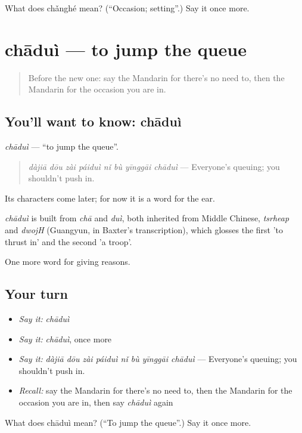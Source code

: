 \begin{tcolorbox}[breakable,colback=teal!4,colframe=teal!35!black,title={Before you move on}]
What does chǎnghé mean? (\textquotedblleft{}Occasion; setting\textquotedblright{}.) Say it once more.
\end{tcolorbox}
\section[chāduì]{chāduì — to jump the queue}

\label{lesson:ZH-C360-chadui}



\begin{quote}
Before the new one: say the Mandarin for there's no need to, then the Mandarin for the occasion you are in.
\end{quote}

\subsection*{You'll want to know: chāduì}
\emph{chāduì} — \textquotedblleft{}to jump the queue\textquotedblright{}.

\begin{quote}
\emph{dàjiā dōu zài páiduì nǐ bù yīnggāi chāduì} — Everyone's queuing; you shouldn't push in.
\end{quote}

Its characters come later; for now it is a word for the ear.

\begin{cousinweb}
\emph{chāduì} is built from \emph{chā} and \emph{duì}, both inherited from Middle Chinese, \emph{tsrheap} and \emph{dwojH} (Guangyun, in Baxter's transcription), which glosses the first 'to thrust in' and the second 'a troop'.
\end{cousinweb}

\begin{grammarlens}[title={What you've built}]
One more word for giving reasons.
\end{grammarlens}

\subsection*{Your turn}
\begin{itemize}
\raggedright
  \item \emph{Say it:} \emph{chāduì}
  \item \emph{Say it:} \emph{chāduì}, once more
  \item \emph{Say it:} \emph{dàjiā dōu zài páiduì nǐ bù yīnggāi chāduì} — Everyone's queuing; you shouldn't push in.
  \item \emph{Recall:} say the Mandarin for there's no need to, then the Mandarin for the occasion you are in, then say \emph{chāduì} again
\end{itemize}

\begin{tcolorbox}[breakable,colback=teal!4,colframe=teal!35!black,title={Before you move on}]
What does chāduì mean? (\textquotedblleft{}To jump the queue\textquotedblright{}.) Say it once more.
\end{tcolorbox}
